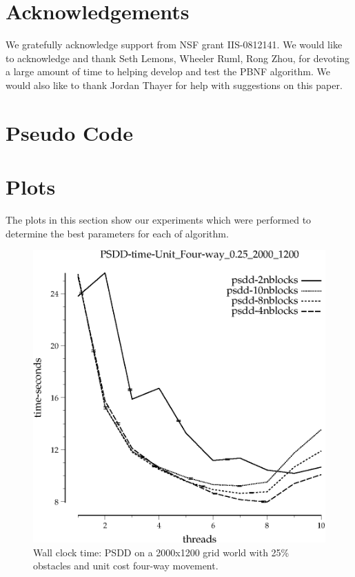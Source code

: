 \documentclass{article}
\begin{document}
\section{Acknowledgements}
We gratefully acknowledge support from NSF grant IIS-0812141.  We
would like to acknowledge and thank Seth Lemons, Wheeler Ruml, Rong
Zhou, for devoting a large amount of time to helping develop and test
the PBNF algorithm.  We would also like to thank Jordan Thayer for
help with suggestions on this paper.




\begin{appendices}
\section{Pseudo Code}



\section{Plots}

The plots in this section show our experiments which were performed to
determine the best parameters for each of algorithm.

\begin{figure}[h]
\begin{center}
\includegraphics{../graphs/grid_unit_four-way_0.25_2000_1200/PSDD-time-Unit_Four-way_0.25_2000_1200.eps}
\caption{Wall clock time: PSDD on a 2000x1200 grid world with 25\%
  obstacles and unit cost four-way movement.}
\end{center}
\end{figure}


\end{appendices}
\end{document}
